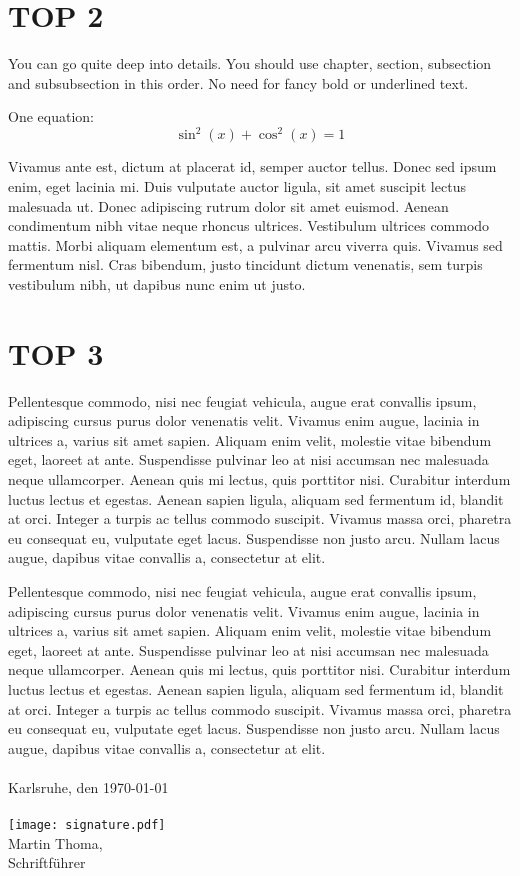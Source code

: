 \documentclass[11pt,a4paper,oneside]{scrartcl}
\newcommand\Schriftfuehrer{Martin Thoma}
\newcommand\Ort{Karlsruhe}
\newcommand\Datum{\today}   %
\begin{document}
\section{TOP 2}
You can go quite deep into details. You should use chapter, section, 
subsection and subsubsection in this order. No need for fancy bold or
underlined text.

One equation:
\begin{equation}
    \sin^2(x) + \cos^2(x) = 1
\end{equation}

Vivamus ante est, dictum at placerat id, semper auctor tellus. Donec 
sed ipsum enim, eget lacinia mi. Duis vulputate auctor ligula, sit 
amet suscipit lectus malesuada ut. Donec adipiscing rutrum dolor sit 
amet euismod. Aenean condimentum nibh vitae neque rhoncus ultrices. 
Vestibulum ultrices commodo mattis. Morbi aliquam elementum est, a 
pulvinar arcu viverra quis. Vivamus sed fermentum nisl. Cras 
bibendum, justo tincidunt dictum venenatis, sem turpis vestibulum 
nibh, ut dapibus nunc enim ut justo. 

\section{TOP 3}
Pellentesque commodo, nisi nec feugiat vehicula, augue erat convallis ipsum, adipiscing cursus purus dolor venenatis velit. Vivamus enim augue, lacinia in ultrices a, varius sit amet sapien. Aliquam enim velit, molestie vitae bibendum eget, laoreet at ante. Suspendisse pulvinar leo at nisi accumsan nec malesuada neque ullamcorper. Aenean quis mi lectus, quis porttitor nisi. Curabitur interdum luctus lectus et egestas. Aenean sapien ligula, aliquam sed fermentum id, blandit at orci. Integer a turpis ac tellus commodo suscipit. Vivamus massa orci, pharetra eu consequat eu, vulputate eget lacus. Suspendisse non justo arcu. Nullam lacus augue, dapibus vitae convallis a, consectetur at elit.

Pellentesque commodo, nisi nec feugiat vehicula, augue erat convallis ipsum, adipiscing cursus purus dolor venenatis velit. Vivamus enim augue, lacinia in ultrices a, varius sit amet sapien. Aliquam enim velit, molestie vitae bibendum eget, laoreet at ante. Suspendisse pulvinar leo at nisi accumsan nec malesuada neque ullamcorper. Aenean quis mi lectus, quis porttitor nisi. Curabitur interdum luctus lectus et egestas. Aenean sapien ligula, aliquam sed fermentum id, blandit at orci. Integer a turpis ac tellus commodo suscipit. Vivamus massa orci, pharetra eu consequat eu, vulputate eget lacus. Suspendisse non justo arcu. Nullam lacus augue, dapibus vitae convallis a, consectetur at elit.
\\\nopagebreak
\\\nopagebreak
\noindent \Ort, den \Datum\\\nopagebreak
\\\nopagebreak
\texttt{[image: signature.pdf]}\\\nopagebreak
\Schriftfuehrer,\\\nopagebreak
Schriftführer
\end{document}
